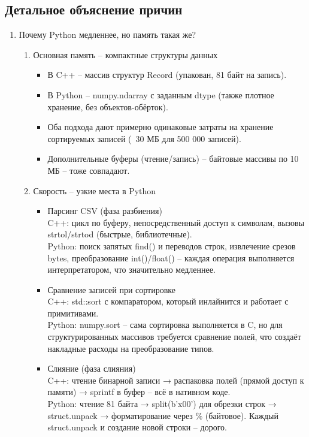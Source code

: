 \documentclass[oneside,a4paper,14pt]{extarticle} %
\begin{document}
	\subsection*{Детальное объяснение причин}
	\begin{enumerate}
		\item Почему Python медленнее, но память такая же? \begin{enumerate}
			\item Основная память – компактные структуры данных \begin{itemize}
				\item В C++ – массив структур Record (упакован, 81 байт на запись).
				\item В Python – numpy.ndarray с заданным dtype (также плотное хранение, без объектов-обёрток).
				\item Оба подхода дают примерно одинаковые затраты на хранение сортируемых записей (~30 МБ для 500 000 записей).
				\item Дополнительные буферы (чтение/запись) – байтовые массивы по 10 МБ – тоже совпадают.
			\end{itemize}
			\item Скорость – узкие места в Python \begin{itemize}
				\item Парсинг CSV (фаза разбиения) \\
				C++: цикл по буферу, непосредственный доступ к символам, вызовы strtol/strtod (быстрые, библиотечные). \\
				Python: поиск запятых find() и переводов строк, извлечение срезов bytes, преобразование int()/float() – каждая операция выполняется интерпретатором, что значительно медленнее.
				\item Сравнение записей при сортировке \\
				C++: std::sort с компаратором, который инлайнится и работает с примитивами. \\
				Python: numpy.sort – сама сортировка выполняется в C, но для структурированных массивов требуется сравнение полей, что создаёт накладные расходы на преобразование типов.
				\item Слияние (фаза слияния) \\
				C++: чтение бинарной записи → распаковка полей (прямой доступ к памяти) → sprintf в буфер – всё в нативном коде. \\
				Python: чтение 81 байта → split(b'x00') для обрезки строк → struct.unpack → форматирование через \% (байтовое). Каждый struct.unpack и создание новой строки – дорого.

\end{itemize}
\end{enumerate}
\end{enumerate}
\end{document}
